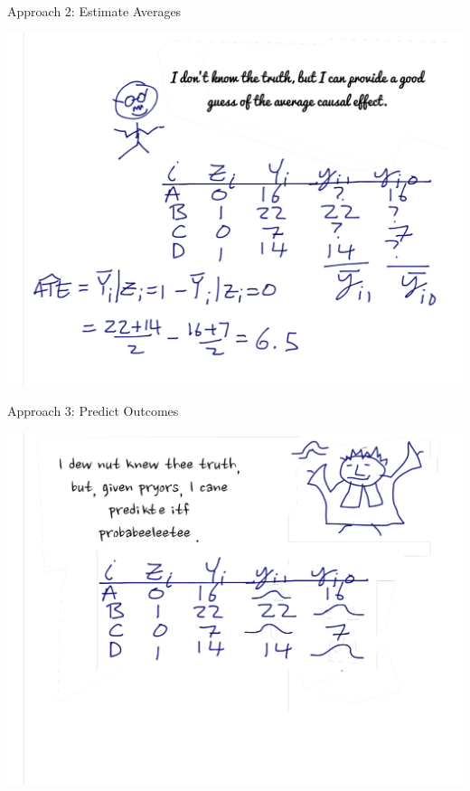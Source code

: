 \begin{frame}{Approach 2: Estimate Averages}

  \smallskip
  \centering
  \includegraphics[width=.9\textwidth]{images/cartoonNeyman.pdf}


\end{frame}


\begin{frame}{Approach 3: Predict Outcomes}

  \smallskip
  \centering
  \includegraphics[width=.9\textwidth]{images/cartoonBayes.pdf}


\end{frame}

